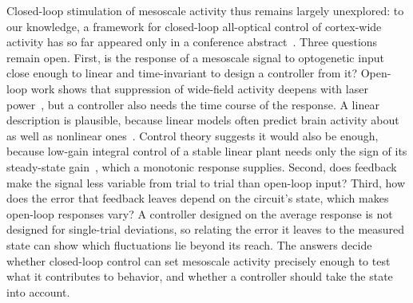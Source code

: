 Closed-loop stimulation of mesoscale activity thus remains largely unexplored: to our knowledge, a framework for closed-loop all-optical control of cortex-wide activity has so far appeared only in a conference abstract~\citep{deAlteriis2026}.
Three questions remain open.
First, is the response of a mesoscale signal to optogenetic input close enough to linear and time-invariant to design a controller from it?
Open-loop work shows that suppression of wide-field activity deepens with laser power~\citep{Ambrosone2025}, but a controller also needs the time course of the response.
A linear description is plausible, because linear models often predict brain activity about as well as nonlinear ones~\citep{Nozari2024}.
Control theory suggests it would also be enough, because low-gain integral control of a stable linear plant needs only the sign of its steady-state gain~\citep{logemann2000absolute}, which a monotonic response supplies.
Second, does feedback make the signal less variable from trial to trial than open-loop input?
Third, how does the error that feedback leaves depend on the circuit's state, which makes open-loop responses vary?
A controller designed on the average response is not designed for single-trial deviations, so relating the error it leaves to the measured state can show which fluctuations lie beyond its reach.
The answers decide whether closed-loop control can set mesoscale activity precisely enough to test what it contributes to behavior, and whether a controller should take the state into account.

